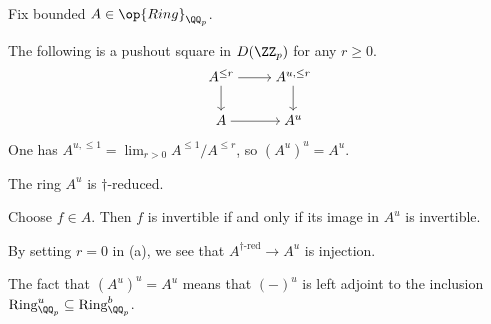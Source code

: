 \documentclass{article}
\begin{document}
\begin{proposition} \label{prop:uniform-properties}
	Fix bounded $A\in\op{Ring}_{\QQ_p}$.
	\begin{listalph}
		\item The following is a pushout square in $D(\ZZ_p)$ for any $r\ge0$.
		\[\begin{tikzcd}[cramped]
			{A^{\le r}} & {A^{u,\le r}} \\
			A & {A^u}
			\arrow[from=1-1, to=1-2]
			\arrow[from=1-1, to=2-1]
			\arrow[from=1-2, to=2-2]
			\arrow[from=2-1, to=2-2]
		\end{tikzcd}\]
		\item One has $A^{u,\le1}=\lim_{r>0}A^{\le1}/A^{\le r}$, so $\left(A^u\right)^u=A^u$.
		\item The ring $A^u$ is $\dagger$-reduced.
		\item Choose $f\in A$. Then $f$ is invertible if and only if its image in $A^u$ is invertible.
	\end{listalph}
\end{proposition}
\begin{remark}
	By setting $r=0$ in (a), we see that $A^{\dagger\textrm{-red}}\to A^u$ is injection.
\end{remark}
\begin{remark}
	The fact that $\left(A^u\right)^u=A^u$ means that $(-)^u$ is left adjoint to the inclusion $\mathrm{Ring}_{\QQ_p}^u\subseteq\mathrm{Ring}_{\QQ_p}^b$.
\end{remark}
\end{document}
